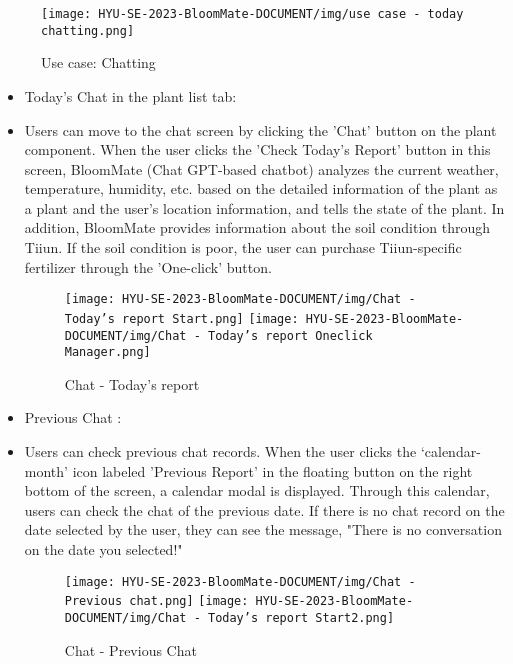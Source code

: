 \documentclass[conference, a4paper]{IEEEtran}
\begin{document}
\begin{enumerate}
        \begin{figure}[h]
        \centering
        \texttt{[image: HYU-SE-2023-BloomMate-DOCUMENT/img/use case - today chatting.png]}
        \caption{Use case: Chatting}
        \label{fig}
        \end{figure}
        
    \begin{itemize}
        
        \item Today's Chat in the plant list tab: 
        \item[] Users can move to the chat screen by clicking the 'Chat' button on the plant component. When the user clicks the 'Check Today's Report' button in this screen, BloomMate (Chat GPT-based chatbot) analyzes the current weather, temperature, humidity, etc. based on the detailed information of the plant as a plant and the user's location information, and tells the state of the plant. In addition, BloomMate provides information about the soil condition through Tiiun. If the soil condition is poor, the user can purchase Tiiun-specific fertilizer through the 'One-click' button.
        \begin{figure}[h]
        \centerline{
            \texttt{[image: HYU-SE-2023-BloomMate-DOCUMENT/img/Chat - Today's report Start.png]}
            \texttt{[image: HYU-SE-2023-BloomMate-DOCUMENT/img/Chat - Today's report Oneclick Manager.png]}
        }
        \label{fig}
        \caption{Chat - Today's report}
        \end{figure}

        \item Previous Chat : 
        \item[] Users can check previous chat records. When the user clicks the ‘calendar-month’ icon labeled 'Previous Report' in the floating button on the right bottom of the screen, a calendar modal is displayed. Through this calendar, users can check the chat of the previous date. If there is no chat record on the date selected by the user, they can see the message, "There is no conversation on the date you selected!"
        \begin{figure}[h]
        \centerline{
            \texttt{[image: HYU-SE-2023-BloomMate-DOCUMENT/img/Chat - Previous chat.png]}
            \texttt{[image: HYU-SE-2023-BloomMate-DOCUMENT/img/Chat - Today's report Start2.png]}
        }
        \label{fig}
        \caption{Chat - Previous Chat}
        \end{figure}
 

\end{itemize}
\end{enumerate}
\end{document}
